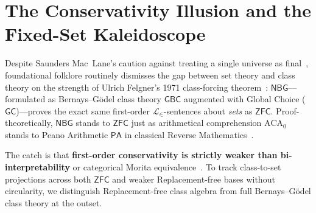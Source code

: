 \section{The Conservativity Illusion and the Fixed-Set Kaleidoscope}\label{sec:conservativity-kaleidoscope}

Despite Saunders Mac~Lane's caution against treating a single universe as final~\cite[Ch.~I, \S 6]{MacLane98}, foundational folklore routinely dismisses the gap between set theory and class theory on the strength of Ulrich Felgner's 1971 class-forcing theorem~\cite{Felgner71}: $\mathsf{NBG}$---formulated as Bernays--G\"odel class theory $\mathsf{GBC}$ augmented with Global Choice ($\mathsf{GC}$)---proves the exact same first-order $\mathcal{L}_\in$-sentences about \emph{sets} as $\mathsf{ZFC}$. Proof-theoretically, $\mathsf{NBG}$ stands to $\mathsf{ZFC}$ just as arithmetical comprehension $\mathrm{ACA}_0$ stands to Peano Arithmetic $\mathsf{PA}$ in classical Reverse Mathematics~\cite{Simpson09}.

The catch is that \textbf{first-order conservativity is strictly weaker than bi-interpretability} or categorical Morita equivalence~\cite{Caramello18}. To track class-to-set projections across both $\mathsf{ZFC}$ and weaker Replacement-free bases without circularity, we distinguish Replacement-free class algebra from full Bernays--G\"odel class theory at the outset.

